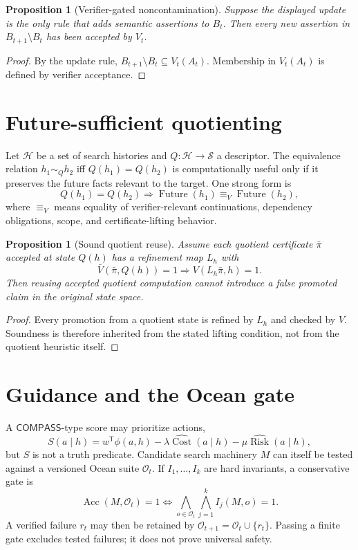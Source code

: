 \documentclass[11pt,oneside]{book}
\newtheorem{proposition}[theorem]{Proposition}
\theoremstyle{definition}
\theoremstyle{remark}
\newcommand{\COMPASS}{\mathsf{COMPASS}}
\newcommand{\OCEAN}{\mathcal O}
\newcommand{\Acc}{\operatorname{Acc}}
\newcommand{\Cost}{\operatorname{Cost}}
\newcommand{\Risk}{\operatorname{Risk}}
\newcommand{\Future}{\operatorname{Future}}
\begin{document}
\begin{proposition}[Verifier-gated noncontamination]
\label{prop:noncontamination}
Suppose the displayed update is the only rule that adds semantic assertions to \(B_t\). Then every
new assertion in \(B_{t+1}\setminus B_t\) has been accepted by \(V_t\).
\end{proposition}

\begin{proof}
By the update rule, \(B_{t+1}\setminus B_t\subseteq V_t(A_t)\). Membership in \(V_t(A_t)\)
is defined by verifier acceptance.
\end{proof}

\section{Future-sufficient quotienting}
Let \(\mathcal H\) be a set of search histories and \(Q:\mathcal H\to\mathcal S\) a descriptor.
The equivalence relation \(h_1\sim_Q h_2\) iff \(Q(h_1)=Q(h_2)\) is computationally useful only
if it preserves the future facts relevant to the target. One strong form is
\[
Q(h_1)=Q(h_2)
\Longrightarrow
\Future(h_1)\equiv_V\Future(h_2),
\]
where \(\equiv_V\) means equality of verifier-relevant continuations, dependency obligations,
scope, and certificate-lifting behavior.

\begin{proposition}[Sound quotient reuse]
\label{prop:quotient-reuse}
Assume each quotient certificate \(\bar\pi\) accepted at state \(Q(h)\) has a refinement map
\(L_h\) with
\[
\bar V(\bar\pi,Q(h))=1\Longrightarrow V(L_h\bar\pi,h)=1.
\]
Then reusing accepted quotient computation cannot introduce a false promoted claim in the original
state space.
\end{proposition}

\begin{proof}
Every promotion from a quotient state is refined by \(L_h\) and checked by \(V\). Soundness is
therefore inherited from the stated lifting condition, not from the quotient heuristic itself.
\end{proof}

\section{Guidance and the Ocean gate}
A \(\COMPASS\)-type score may prioritize actions,
\[
S(a\mid h)=w^{\mathsf T}\phi(a,h)-\lambda\widehat{\Cost}(a\mid h)
-\mu\widehat{\Risk}(a\mid h),
\]
but \(S\) is not a truth predicate. Candidate search machinery \(M\) can itself be tested against a
versioned Ocean suite \(\OCEAN_t\). If \(I_1,\ldots,I_k\) are hard invariants, a conservative gate is
\[
\Acc(M,\OCEAN_t)=1
\iff
\bigwedge_{o\in\OCEAN_t}\bigwedge_{j=1}^{k}I_j(M,o)=1.
\]
A verified failure \(r_t\) may then be retained by \(\OCEAN_{t+1}=\OCEAN_t\cup\{r_t\}\).
Passing a finite gate excludes tested failures; it does not prove universal safety.
\end{document}
